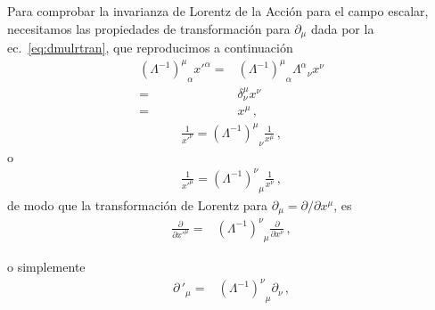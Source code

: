 Para comprobar la invarianza de Lorentz de la Acción para el campo escalar, necesitamos las propiedades de transformación para $\partial_\mu$ dada por la ec.~\eqref{eq:dmulrtran}, que reproducimos a continuación
\begin{align}
  {\left(\Lambda^{-1}\right)^\mu}_\alpha{x'}^\alpha=&{\left(\Lambda^{-1}\right)^\mu}_\alpha{\Lambda^\alpha}_\nu x^\nu\nonumber\\
=&\delta^\mu_\nu x^\nu\nonumber\\
=&x^\mu\,,
\end{align}
\begin{align}
  \frac{1}{{x'}^\nu}= {\left(\Lambda^{-1}\right)^\mu}_\nu\frac{1}{x^\mu}\,,
\end{align}
o
\begin{align}
  \label{eq:183qft}
    \frac{1}{{x'}^\mu}= {\left(\Lambda^{-1}\right)^\nu}_\mu\frac{1}{x^\nu}\,,
\end{align}
de modo que la transformación de Lorentz para $\partial_\mu=\partial/\partial x^\mu$, es
\begin{align}
     \frac{\partial}{{\partial x'}^\mu}=& {\left(\Lambda^{-1}\right)^\nu}_\mu\frac{\partial}{\partial x^\nu}\,,
\end{align}
\begin{frame}
o simplemente
\begin{align*}
     {\partial\,}'_\mu=& {\left(\Lambda^{-1}\right)^\nu}_\mu\partial_\nu\,,
\end{align*}
\end{frame}

